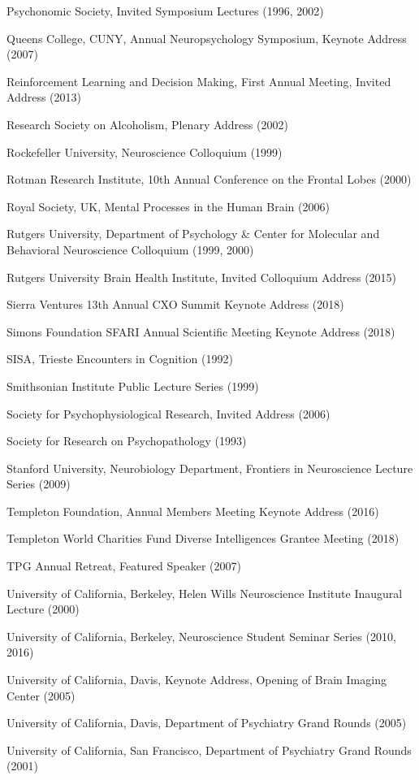 \documentclass[10 pt]{article}
\begin{document}
Psychonomic Society, Invited Symposium Lectures (1996, 2002)

Queens College, CUNY, Annual Neuropsychology Symposium, Keynote Address (2007)

Reinforcement Learning and Decision Making, First Annual Meeting, Invited Address (2013)

Research Society on Alcoholism, Plenary Address (2002)

Rockefeller University, Neuroscience Colloquium (1999)

Rotman Research Institute, 10th Annual Conference on the Frontal Lobes (2000)

Royal Society, UK, Mental Processes in the Human Brain (2006)

Rutgers University, Department of Psychology \& Center for Molecular and Behavioral Neuroscience Colloquium (1999, 2000)

Rutgers University Brain Health Institute, Invited Colloquium Address (2015)

Sierra Ventures 13th Annual CXO Summit Keynote Address (2018)

Simons Foundation SFARI Annual Scientific Meeting Keynote Address (2018)

SISA, Trieste Encounters in Cognition (1992)

Smithsonian Institute Public Lecture Series (1999)

Society for Psychophysiological Research, Invited Address (2006)

Society for Research on Psychopathology (1993)

Stanford University, Neurobiology Department, Frontiers in Neuroscience Lecture Series (2009)

Templeton Foundation, Annual Members Meeting Keynote Address (2016)

Templeton World Charities Fund Diverse Intelligences Grantee Meeting (2018)

TPG Annual Retreat, Featured Speaker (2007)

University of California, Berkeley, Helen Wills Neuroscience Institute Inaugural Lecture (2000)

University of California, Berkeley, Neuroscience Student Seminar Series (2010, 2016)

University of California, Davis, Keynote Address, Opening of Brain Imaging Center (2005)

University of California, Davis, Department of Psychiatry Grand Rounds (2005)

University of California, San Francisco, Department of Psychiatry Grand Rounds (2001)
\end{document}
